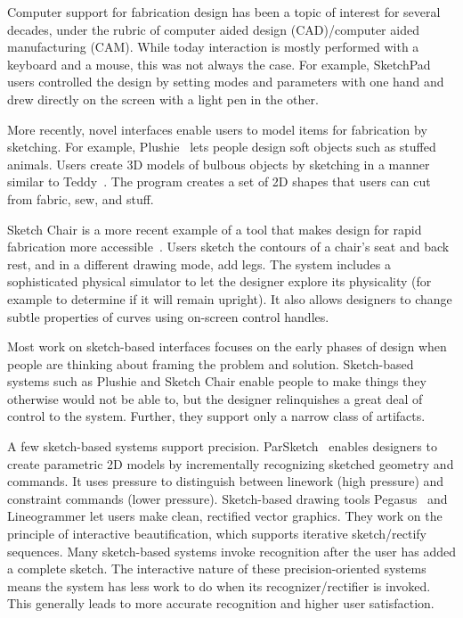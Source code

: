 \documentclass{article}
\begin{document}
Computer support for fabrication design has been a topic of interest
for several decades, under the rubric of computer aided design
(CAD)/computer aided manufacturing (CAM). While today interaction is
mostly performed with a keyboard and a mouse, this was not always the
case. For example, SketchPad~\cite{sutherland-sketchpad} users
controlled the design by setting modes and parameters with one hand
and drew directly on the screen with a light pen in the other.

More recently, novel interfaces enable users to model items for
fabrication by sketching. For example, Plushie~\cite{mori-plushie}
lets people design soft objects such as stuffed animals. Users create
3D models of bulbous objects by sketching in a manner similar to
Teddy~\cite{igarashi-teddy}. The program creates a set of 2D shapes
that users can cut from fabric, sew, and stuff.

Sketch Chair is a more recent example of a tool that makes design for
rapid fabrication more accessible~\cite{saul-sketch-chair}. Users
sketch the contours of a chair's seat and back rest, and in a
different drawing mode, add legs. The system includes a sophisticated
physical simulator to let the designer explore its physicality (for
example to determine if it will remain upright). It also allows
designers to change subtle properties of curves using on-screen
control handles.

Most work on sketch-based interfaces focuses on the early phases of
design when people are thinking about framing the problem and
solution. Sketch-based systems such as Plushie and Sketch Chair enable
people to make things they otherwise would not be able to, but the
designer relinquishes a great deal of control to the system. Further,
they support only a narrow class of artifacts.

A few sketch-based systems support
precision. ParSketch~\cite{naya-parsketch} enables designers to create
parametric 2D models by incrementally recognizing sketched geometry
and commands. It uses pressure to distinguish between linework (high
pressure) and constraint commands (lower pressure). Sketch-based
drawing tools Pegasus~\cite{igarashi-pegasus} and Lineogrammer let
users make clean, rectified vector graphics. They work on the
principle of interactive beautification, which supports iterative
sketch/rectify sequences. Many sketch-based systems invoke recognition
after the user has added a complete sketch. The interactive nature of
these precision-oriented systems means the system has less work to do
when its recognizer/rectifier is invoked. This generally leads to more
accurate recognition and higher user satisfaction.
\end{document}
